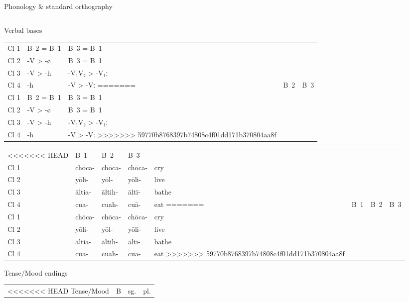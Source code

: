 \documentclass[12pt]{beamer}
\newcommand{\nah}[1]{\textcolor{nahgrn}{#1}}
\newcommand{\trs}[1]{\textcolor{nahblu}{#1}}
\begin{document}
\begin{frame}
\begin{columns}[t]
\begin{column}{.22\linewidth}
\begin{block}{Phonology \& standard orthography}
\begin{threeparttable}
\begin{tablenotes}
\begin{frame}
\begin{frame}
\begin{columns}[t]
\begin{column}{.18\linewidth}
\begin{block}{Verbal bases}
\begin{tabular}{lll}
          Cl 1 & B~2 = B~1 & B~3 = B~1 \\
          Cl 2 & \nah{-V > -ø}      & B~3 = B~1 \\
          Cl 3 & \nah{-V > -h}     & \nah{-V₁V₂ > -V₁ː}   \\
          Cl 4 & \nah{-h}     & \nah{-V > -Vː}  
=======
               & B~2           & B~3                \\
          Cl 1 & B~2 = B~1     & B~3 = B~1          \\
          Cl 2 & \nah{-V > -ø} & B~3 = B~1          \\
          Cl 3 & \nah{-V > -h} & \nah{-V₁V₂ > -V₁ː} \\
          Cl 4 & \nah{-h}      & \nah{-V > -Vː}
>>>>>>> 59770b8768397b74808c4f01dd171b370804aa8f
        \end{tabular}
      \end{block}
      \begin{example}
        \begin{tabular}{lllll}
<<<<<<< HEAD
          & B~1          & B~2          & B~3          &                \\
          Cl 1 & \nah{chōca-} & \nah{chōca-} & \nah{chōca-} & \trs{cry}   \\
          Cl 2 & \nah{yōli-}  & \nah{yōl-}   & \nah{yōli-}  & \trs{live}  \\
          Cl 3 & \nah{āltia-} & \nah{āltih-} & \nah{āltī-}  & \trs{bathe} \\
          Cl 4 & \nah{cua-}   & \nah{cuah-}  & \nah{cuā-}   & \trs{eat}  
=======
               & B~1          & B~2          & B~3          &             \\
          Cl 1 & \nah{chōca-} & \nah{chōca-} & \nah{chōca-} & \trs{cry}   \\
          Cl 2 & \nah{yōli-}  & \nah{yōl-}   & \nah{yōli-}  & \trs{live}  \\
          Cl 3 & \nah{āltia-} & \nah{āltih-} & \nah{āltī-}  & \trs{bathe} \\
          Cl 4 & \nah{cua-}   & \nah{cuah-}  & \nah{cuā-}   & \trs{eat}
>>>>>>> 59770b8768397b74808c4f01dd171b370804aa8f
        \end{tabular}
      \end{example}
      \begin{block}{Tense/Mood endings}
        \begin{threeparttable}
          \begin{tabular}{llll}
<<<<<<< HEAD
            Tense/Mood  & B & sg.             & pl.                        \\

\end{tabular}
\end{threeparttable}
\end{block}
\end{column}
\end{columns}
\end{frame}
\end{frame}
\end{tablenotes}
\end{threeparttable}
\end{block}
\end{column}
\end{columns}
\end{frame}
\end{document}
